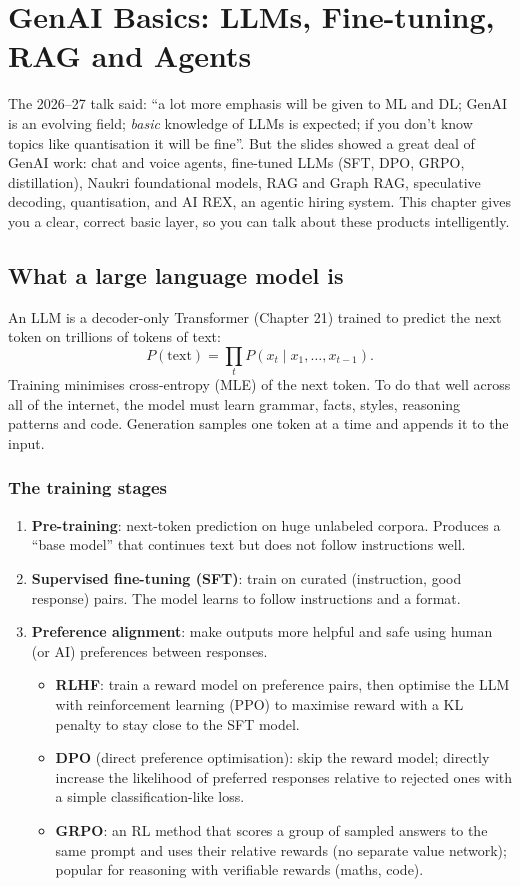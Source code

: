 \chapter{GenAI Basics: LLMs, Fine-tuning, RAG and Agents}

The 2026--27 talk said: ``a lot more emphasis will be given to ML and DL; GenAI is an evolving field; \emph{basic} knowledge of LLMs is
expected; if you don't know topics like quantisation it will be fine''. But the slides showed a great deal of GenAI work: chat and voice agents,
fine-tuned LLMs (SFT, DPO, GRPO, distillation), Naukri foundational models, RAG and Graph RAG, speculative decoding, quantisation, and AI REX, an
agentic hiring system. This chapter gives you a clear, correct basic layer, so you can talk about these products intelligently.

\section{What a large language model is}
An LLM is a decoder-only Transformer (Chapter 21) trained to predict the next token on trillions of tokens of text:
\[ P(\text{text}) = \prod_tP(x_t\mid x_1,\dots,x_{t-1}). \]
Training minimises cross-entropy (MLE) of the next token. To do that well across all of the internet, the model must learn grammar, facts, styles,
reasoning patterns and code. Generation samples one token at a time and appends it to the input.

\subsection{The training stages}
\begin{enumerate}
\item \textbf{Pre-training}: next-token prediction on huge unlabeled corpora. Produces a ``base model'' that continues text but does not follow instructions well.
\item \textbf{Supervised fine-tuning (SFT)}: train on curated (instruction, good response) pairs. The model learns to follow instructions and a format.
\item \textbf{Preference alignment}: make outputs more helpful and safe using human (or AI) preferences between responses.
  \begin{itemize}
  \item \textbf{RLHF}: train a reward model on preference pairs, then optimise the LLM with reinforcement learning (PPO) to maximise reward with a KL penalty to stay close
    to the SFT model.
  \item \textbf{DPO} (direct preference optimisation): skip the reward model; directly increase the likelihood of preferred responses relative to rejected ones with a
    simple classification-like loss.
  \item \textbf{GRPO}: an RL method that scores a group of sampled answers to the same prompt and uses their relative rewards (no separate value network); popular for
    reasoning with verifiable rewards (maths, code).
  \end{itemize}
\end{enumerate}

